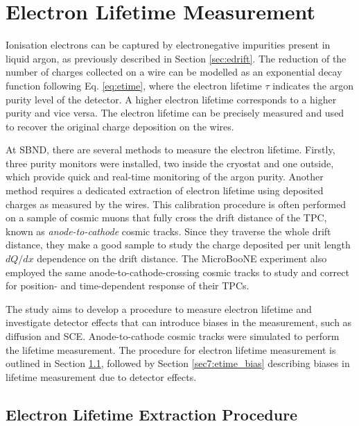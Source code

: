 \section{Electron Lifetime Measurement}
\label{sec7:etime}

Ionisation electrons can be captured by electronegative impurities present in liquid argon, as previously described in Section \ref{sec:edrift}.
The reduction of the number of charges collected on a wire can be modelled as an exponential decay function following Eq. \ref{eq:etime}, where the electron lifetime $\tau$ indicates the argon purity level of the detector.
A higher electron lifetime corresponds to a higher purity and vice versa.
The electron lifetime can be precisely measured and used to recover the original charge deposition on the wires.

At SBND, there are several methods to measure the electron lifetime.
Firstly, three purity monitors were installed, two inside the cryostat and one outside, which provide quick and real-time monitoring of the argon purity.
Another method requires a dedicated extraction of electron lifetime using deposited charges as measured by the wires.
This calibration procedure is often performed on a sample of cosmic muons that fully cross the drift distance of the TPC, known as \textit{anode-to-cathode} cosmic tracks.
Since they traverse the whole drift distance, they make a good sample to study the charge deposited per unit length $dQ/dx$ dependence on the drift distance.
The MicroBooNE experiment also employed the same anode-to-cathode-crossing cosmic tracks to study and correct for position- and time-dependent response of their TPCs\cite{uboone_calib}.

The study aims to develop a procedure to measure electron lifetime and investigate detector effects that can introduce biases in the measurement, such as diffusion and SCE.
Anode-to-cathode cosmic tracks were simulated to perform the lifetime measurement.
The procedure for electron lifetime measurement is outlined in Section \ref{sec7:etime_procedure}, followed by Section \ref{sec7:etime_bias} describing biases in lifetime measurement due to detector effects.


\subsection{Electron Lifetime Extraction Procedure}
\label{sec7:etime_procedure}

